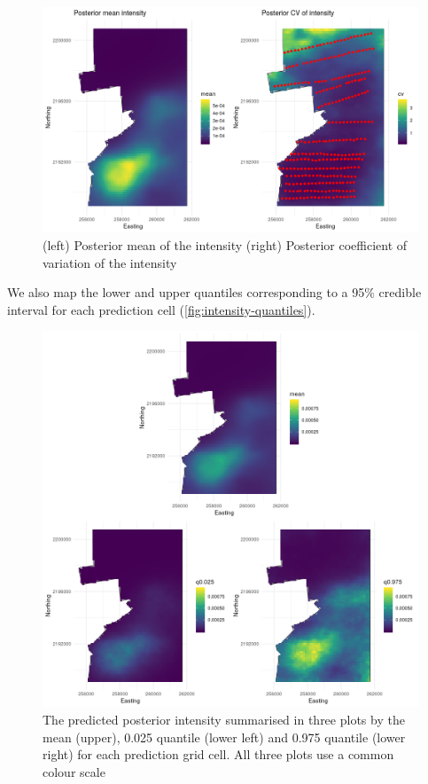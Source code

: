 \documentclass[preprint,12pt]{elsarticle}
\begin{document}
\begin{figure}
	\includegraphics[scale=0.5]{figures/intensity_mean_cv.png}
	\caption{(left) Posterior mean of the intensity (right) Posterior coefficient of variation of the intensity}
	\label{fig:intensity-mean-cv}
\end{figure}

We also map the lower and upper quantiles corresponding to a 95\% credible interval for each prediction cell (\autoref{fig:intensity-quantiles}).
\begin{figure}[h]
	\includegraphics[scale=0.5]{figures/intensity_quantiles.png}
	\caption{The predicted posterior intensity summarised in three plots by the mean (upper),  0.025 quantile (lower left) and 0.975 quantile (lower right) for each prediction grid cell.  All three plots use a common colour scale}
	\label{fig:intensity-quantiles}
\end{figure}
\end{document}
